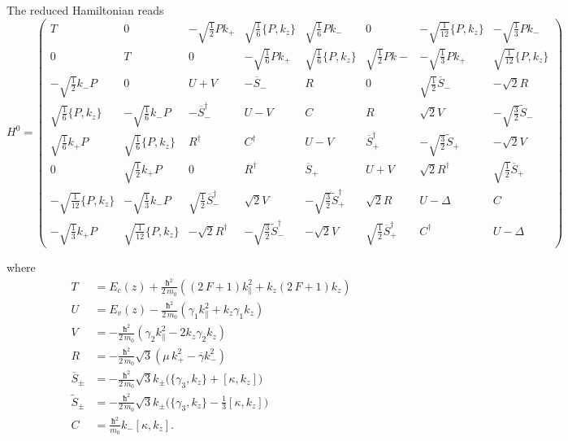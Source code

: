 \documentclass[prb,aps]{revtex4}
\begin{document}
		The reduced Hamiltonian reads
		\begin{equation}
		    \renewcommand{\arraystretch}{3.5}
			\label{eq:H0}
			H^0=
			\begin{pmatrix}
				T & 0 &  -\sqrt{\frac12} P k_+  & \sqrt{\frac{1}{6}} \{P, k_z\} &\sqrt{\frac16} P k_- & 0  & -\sqrt{\frac{1}{12}} \{P, k_z\} & -\sqrt{\frac13} P k_-\\
				0 & T & 0 & -\sqrt{\frac16} P k_+ &  \sqrt{\frac{1}{6}} \{P, k_z\} & \sqrt{\frac12} P k- & -\sqrt{\frac13} P k_+ & \sqrt{\frac{1}{12}} \{P, k_z\}\\
				-\sqrt{\frac12}  k_- P & 0 & U+V & -\overline{S}_- & R & 0 & \sqrt{\frac12} \overline{S}_- & -\sqrt{2} R \\
				\sqrt{\frac{1}{6}} \{P, k_z\} & -\sqrt{\frac16} k_- P & - \overline{S}_-^\dagger & U-V & C & R & \sqrt{2} V & -\sqrt{\frac32} \tilde{S}_- \\
				\sqrt{\frac16} k_+ P & \sqrt{\frac{1}{6}} \{P, k_z\} & R^\dagger & C^\dagger & U-V & \overline{S}_+^\dagger & -\sqrt{\frac32} \tilde{S}_+ & -\sqrt{2} V \\
				0 & \sqrt{\frac12} k_+ P & 0 & R^\dagger & \overline{S}_+ & U+V & \sqrt{2} R^\dag & \sqrt{\frac12} \overline{S}_+ \\
				-\sqrt{\frac{1}{12}} \{P, k_z\} & -\sqrt{\frac13} k_- P & \sqrt{\frac12} \overline{S}^{\dag}_- & \sqrt{2} V & -\sqrt{\frac32} \tilde{S}^\dag_+ & \sqrt{2} R & U - Δ & C \\
				-\sqrt{\frac13} k_+ P & \sqrt{\frac{1}{12}} \{P, k_z\} & -\sqrt{2} R^\dag & -\sqrt{\frac32} \tilde{S}_-^\dag & -\sqrt{2} V & \sqrt{\frac12} \overline{S}_+^\dag & C^\dag & U - Δ
			\end{pmatrix}
		\end{equation}

		 where
		 \begin{align}
			 T &= E_c(z) + \frac{ħ^2}{2\,m_0} \left( (2\,F+1) k_\parallel^2 + k_z (2\,F+1) k_z\right)  \\
			 U &= E_v(z) - \frac{ħ^2 }{2\,m_0} \left( γ_1 k_\parallel^2 + k_z γ_1 k_z \right) \\
			 V &=  - \frac{ħ^2 }{2\,m_0} \left( γ_2 k_\parallel^2 -2 k_z γ_2 k_z \right) \\
			R &= - \frac{ħ^2 }{2\,m_0} \sqrt{3} \left( μ\,k_+^2 - \overline{γ} k_-^2 \right) \\
			\overline{S}_\pm &= - \frac{ħ^2 }{2\,m_0} \sqrt{3}  k_\pm \Big( \{ γ_3 , k_z \} + [κ , k_z] \Big) \\
			\tilde{S}_\pm &= - \frac{ħ^2 }{2\,m_0} \sqrt{3}  k_\pm \Big( \{ γ_3 , k_z \} - \frac13 [κ , k_z] \Big) \\
			C &= \frac{ħ^2 }{m_0} k_- [κ , k_z ]  .
		\end{align}
\end{document}
